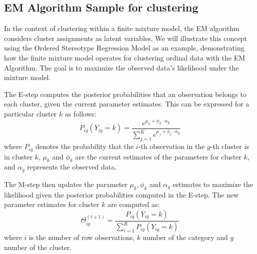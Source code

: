 \documentclass{article}
\begin{document}







\subsection{EM Algorithm Sample for clustering}
In the context of clustering within a finite mixture model, the EM algorithm considers cluster assignments as latent variables. 
We will illustrate this concept using the Ordered Stereotype Regression Model as an example, demonstrating how the finite mixture model operates for clustering ordinal data with the EM Algorithm. 
The goal is to maximize the observed data's likelihood under the mixture model.

The E-step computes the posterior probabilities that an observation belongs to each cluster, given the current parameter estimates. 
This can be expressed for a particular cluster \( k \) as follows:
\begin{equation}
P_{ig}(Y_{ig} = k) = \frac{e^{\mu_k + \phi_k \cdot \alpha_g}}{\sum_{j=1}^{K} e^{\mu_j + \phi_j \cdot \alpha_g}}
\end{equation}
where \( P_{ig} \) denotes the probability that the \( i \)-th observation in the \( g \)-th cluster is in cluster \( k \), \( \mu_k \) and \( \phi_k \) are the current estimates of the parameters for cluster \( k \), and \( \alpha_g \) represents the observed data.

The M-step then updates the parameter $\mu_k, \phi_k$ and $\alpha_g$ estimates to maximize the likelihood given the posterior probabilities computed in the E-step. 
The new parameter estimates for cluster \( k \) are computed as:
\begin{equation}
\Theta_{ig}^{(t+1)} = \frac{P_{ig}(Y_{ig} = k)}{\sum_{i=1}^{R} P_{ig}(Y_{ig} = k)}
\end{equation}
where \( i \) is the number of row observations, \( k \) number of the category and \( g \) number of the cluster.
\end{document}

